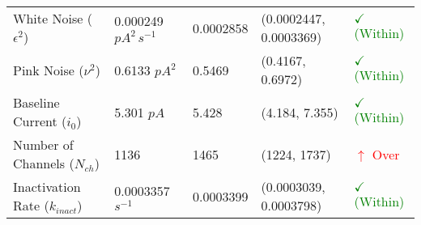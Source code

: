 \documentclass[12pt]{article}
\begin{document}
\begin{table}[
	htbp
	]
\begin{tabular}{@{}lllll@{}}
		White Noise ($\epsilon^2$) & 0.000249 $pA^2\,s^{-1}$ & 0.0002858 & (0.0002447, 0.0003369) & \textcolor{green}{$\checkmark$ (Within)} \\
		Pink Noise ($\nu^2$) & 0.6133 $pA^2$ & 0.5469 & (0.4167, 0.6972) & \textcolor{green}{$\checkmark$ (Within)} \\
		Baseline Current ($i_{0}$) & 5.301 $pA$ & 5.428 & (4.184, 7.355) & \textcolor{green}{$\checkmark$ (Within)} \\
		Number of Channels ($N_{ch}$) & 1136  & 1465 & (1224, 1737) & \textcolor{red}{$\uparrow$ Over} \\
		Inactivation Rate ($k_{inact}$) & 0.0003357 $s^{-1}$ & 0.0003399 & (0.0003039, 0.0003798) & \textcolor{green}{$\checkmark$ (Within)} \\
		\hline
	\end{tabular}
\end{table}
\end{document}
